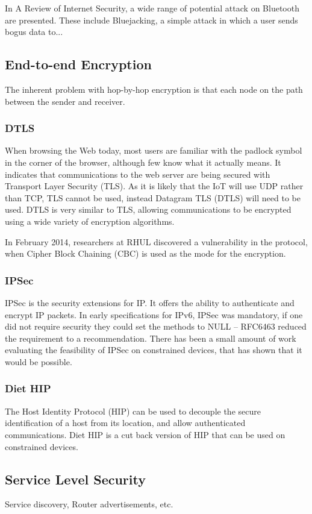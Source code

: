 \documentclass[10pt,journal,compsoc]{IEEEtran}
\begin{document}
In A Review of Internet Security, a wide range of potential attack on Bluetooth
are presented. These include Bluejacking, a simple attack in which a user sends
bogus data to... 


\subsection{End-to-end Encryption}
The inherent problem with hop-by-hop encryption is that each node on the path
between the sender and receiver.   

\subsubsection{DTLS}
When browsing the Web today, most users are familiar with the padlock symbol in
the corner of the browser, although few know what it actually means. It
indicates that communications to the web server are being secured with
Transport Layer Security (TLS). As it is likely that the IoT will use UDP
rather than TCP, TLS cannot be used, instead Datagram TLS (DTLS) will need to
be used. DTLS is very similar to TLS, allowing communications to be encrypted
using a wide variety of encryption algorithms.  

In February 2014, researchers at RHUL discovered a vulnerability in the
protocol, when Cipher Block Chaining (CBC) is used as the mode for the
encryption. 


\subsubsection{IPSec}
IPSec is the security extensions for IP. It offers the ability to authenticate
and encrypt IP packets. In early specifications for IPv6, IPSec was mandatory,
if one did not require security they could set the methods to NULL -- RFC6463
reduced the requirement to a recommendation. There has been a small amount
of work evaluating the feasibility of IPSec on constrained devices, that
has shown that it would be possible. 

\subsubsection{Diet HIP}
The Host Identity Protocol (HIP) can be used to decouple the secure
identification of a host from its location, and allow authenticated
communications. Diet HIP is a cut back version of HIP that can be used on
constrained devices. 

\subsection{Service Level Security}
Service discovery, Router advertisements, etc.
\end{document}
